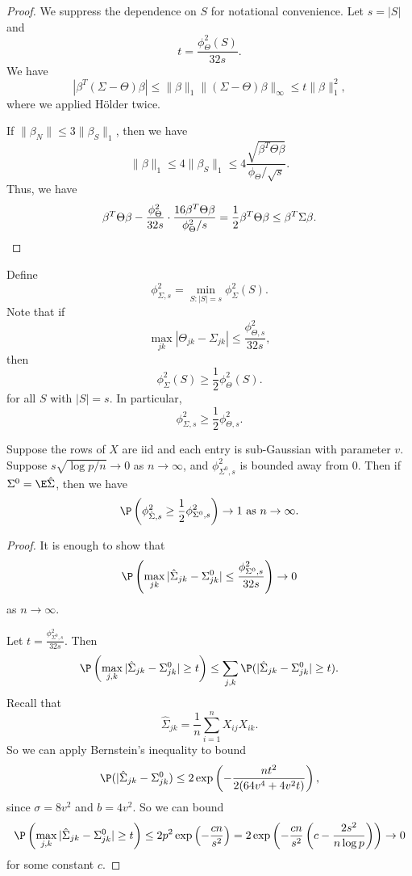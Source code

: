 \documentclass[a4paper]{article}
\begin{document}
\begin{proof}
  We suppress the dependence on $S$ for notational convenience. Let $s = |S|$ and
  \[
    t = \frac{\phi^2_\Theta(S)}{32s}.
  \]
  We have
  \[
    |\beta^T (\Sigma - \Theta) \beta| \leq \|\beta\|_1 \|(\Sigma - \Theta) \beta\|_\infty \leq t\|\beta\|_1^2,
  \]
  where we applied H\"older twice.

  If $\|\beta_N\| \leq 3 \|\beta_S\|_1$, then we have
  \[
    \|\beta\|_1 \leq 4 \|\beta_S\|_1 \leq 4\frac{\sqrt{\beta^T \Theta \beta}}{\phi_\Theta/\sqrt{s}}.
  \]
  Thus, we have
  \[
    \beta^T \Theta \beta - \frac{\phi^2_\Theta}{32 s} \cdot \frac{16 \beta^T \Theta \beta}{\phi^2_\Theta /s} = \frac{1}{2} \beta^T \Theta \beta \leq \beta^T \Sigma \beta.\qedhere
  \]
\end{proof}

Define
\[
  \phi^2_{\Sigma, s} = \min_{S: |S| = s} \phi^2_\Sigma(S).
\]
Note that if
\[
  \max_{jk} |\Theta_{jk} - \Sigma_{jk}| \leq \frac{\phi^2_{\Theta, s}}{32 s},
\]
then
\[
  \phi^2_\Sigma(S) \geq \frac{1}{2} \phi^2_\Theta(S).
\]
for all $S$ with $|S| = s$. In particular,
\[
  \phi^2_{\Sigma, s} \geq \frac{1}{2} \phi^2_{\Theta, s}.
\]
\begin{thm}
  Suppose the rows of $X$ are iid and each entry is sub-Gaussian with parameter $v$. Suppose $s \sqrt{\log p / n} \to 0$ as $n \to \infty$, and $\phi^2_{\Sigma^0, s}$ is bounded away from $0$. Then if $\Sigma^0 = \E \hat{\Sigma}$, then we have
  \[
    \P\left(\phi^2_{\hat{\Sigma}, s} \geq \frac{1}{2} \phi^2_{\Sigma^0, s}\right) \to 1\text{ as }n \to \infty. %
  \]
\end{thm}

\begin{proof}
  It is enough to show that
  \[
    \P\left(\max_{jk} |\hat{\Sigma}_{jk} - \Sigma^0_{jk}| \leq \frac{\phi^2_{\Sigma^0, s}}{32 s}\right) \to 0
  \]
  as $n \to \infty$.

  Let $t = \frac{\phi_{\Sigma^0, s}^2}{32 s}$. Then
  \[
    \P \left(\max_{j,k} |\hat{\Sigma}_{jk} - \Sigma^0_{jk}| \geq t\right) \leq \sum_{j, k} \P(|\hat{\Sigma}_{jk} - \Sigma^0_{jk}| \geq t).
  \]
  Recall that
  \[
    \hat{\Sigma}_{jk} = \frac{1}{n} \sum_{i = 1}^n X_{ij} X_{ik}.
  \]
  So we can apply Bernstein's inequality to bound
  \[
    \P(|\hat{\Sigma}_{jk} - \Sigma^0_{jk}) \leq 2 \exp \left(-\frac{nt^2}{2 (64 v^4 + 4 v^2 t)}\right),
  \]
  since $\sigma = 8v^2$ and $b = 4 v^2$. So we can bound
  \[
    \P \left(\max_{j,k} |\hat{\Sigma}_{jk} - \Sigma^0_{jk}| \geq t\right) \leq 2 p^2 \exp \left( - \frac{c n}{s^2}\right) = 2 \exp \left(-\frac{c n}{s^2}\left(c - \frac{2s^2}{n \log p}\right)\right) \to 0
  \]
  for some constant $c$.
\end{proof}
\end{document}
